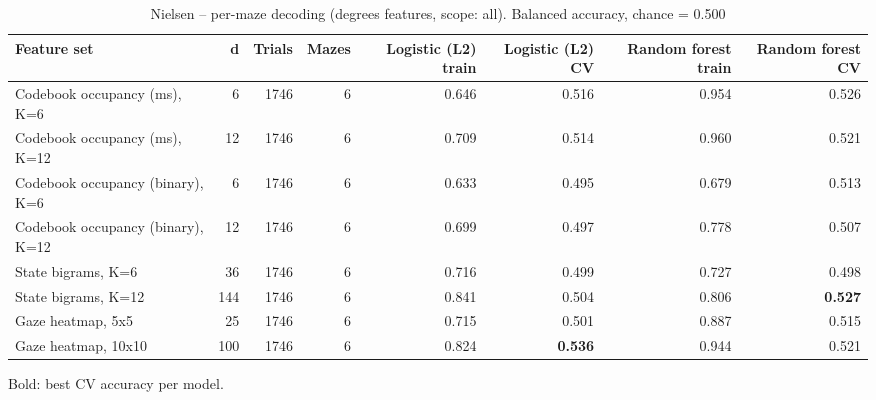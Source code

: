 \begin{table}[t]
\centering
\caption{Nielsen -- per-maze decoding (degrees features, scope: all). Balanced accuracy, chance = 0.500}
\label{tab:permaze_Nielsen}
\begin{tabular}{lrrrrrrr}
\toprule
Feature set & d & Trials & Mazes & Logistic (L2) train & Logistic (L2) CV & Random forest train & Random forest CV \\
\midrule
Codebook occupancy (ms), K=6 & 6 & 1746 & 6 & 0.646 & 0.516 & 0.954 & 0.526 \\
Codebook occupancy (ms), K=12 & 12 & 1746 & 6 & 0.709 & 0.514 & 0.960 & 0.521 \\
Codebook occupancy (binary), K=6 & 6 & 1746 & 6 & 0.633 & 0.495 & 0.679 & 0.513 \\
Codebook occupancy (binary), K=12 & 12 & 1746 & 6 & 0.699 & 0.497 & 0.778 & 0.507 \\
State bigrams, K=6 & 36 & 1746 & 6 & 0.716 & 0.499 & 0.727 & 0.498 \\
State bigrams, K=12 & 144 & 1746 & 6 & 0.841 & 0.504 & 0.806 & \textbf{0.527} \\
Gaze heatmap, 5x5 & 25 & 1746 & 6 & 0.715 & 0.501 & 0.887 & 0.515 \\
Gaze heatmap, 10x10 & 100 & 1746 & 6 & 0.824 & \textbf{0.536} & 0.944 & 0.521 \\
\bottomrule
\end{tabular}
\par\smallskip
{\footnotesize Bold: best CV accuracy per model.}
\end{table}
